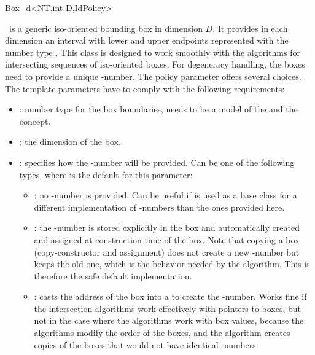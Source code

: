 

\begin{ccRefClass}{Box_d<NT,int D,IdPolicy>}
\ccDefinition

\ccRefName\ is a generic iso-oriented bounding box in dimension $D$.
It provides in each dimension an interval with lower and upper
endpoints represented with the number type .  This class is
designed to work smoothly with the algorithms for intersecting
sequences of iso-oriented boxes. For degeneracy handling, the boxes
need to provide a unique -number. The policy parameter
 offers several choices. The template parameters have to
comply with the following requirements:

\begin{itemize}
  \item
    : number type for the box boundaries, needs to be a model
    of the  and the  concept.
  \item
    : the dimension of the box.
  \item
    : specifies how the -number will be
    provided. Can be one of the following types, where
     is the default for this parameter:
    \begin{itemize}
      \item
        : no -number is provided. Can be useful
        if  is used as a base class for a different
        implementation of -numbers than the ones provided
        here.
      \item
        : the -number is stored explicitly in
        the box and automatically created and assigned at construction
        time of the box. Note that copying a box (copy-constructor and
        assignment) does not create a new -number but keeps
        the old one, which is the behavior needed by the
         algorithm. This is therefore
        the safe default implementation. 
      \item
        : casts the address of the box into a
         to create the -number. Works fine 
        if the intersection algorithms work effectively with pointers
        to boxes, but not in the case where the algorithms work with
        box values, because the algorithms modify the order of the
        boxes, and the  algorithm
        creates copies of the boxes that would not have identical
        -numbers.  
    \end{itemize}
\end{itemize}


\end{ccRefClass}
